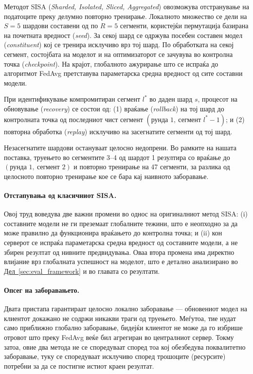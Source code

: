 Методот SISA (\emph{Sharded, Isolated, Sliced, Aggregated}) \cite{bourtoule2021sisa} овозможува отстранување на податоците преку делумно повторно тренирање. Локалното множество се дели на $S=5$ шардови составени од по $R=5$ сегменти, користејќи пермутација базирана на почетната вредност (\emph{seed}). За секој шард се одржува посебен составен модел (\emph{constituent}) кој се тренира исклучиво врз тој шард. По обработката на секој сегмент, состојбата на моделот и на оптимизаторот се зачувува во контролна точка (\emph{checkpoint}). На крајот, глобалното ажурирање што се испраќа до алгоритмот FedAvg претставува параметарска средна вредност од сите составни модели.

При идентификување компромитиран сегмент $l^{*}$ во даден шард $s$, процесот на обновување (\emph{recovery}) се состои од:
(1) враќање (\emph{rollback}) на тој шард до контролната точка од последниот чист сегмент $(\text{рунда }1,\ \text{сегмент }l^{*}\!-\!1)$; и
(2) повторна обработка (\emph{replay}) исклучиво на засегнатите сегменти од тој шард. 

Незасегнатите шардови остануваат целосно недопрени. Во рамките на нашата поставка, труењето во сегментите 3--4 од шардот 1 резултира со враќање до $(\text{рунда }1,\ \text{сегмент }2)$ и повторно тренирање на 47 сегменти, за разлика од целосното повторно тренирање кое се бара кај наивното заборавање.

\paragraph{Отстапувања од класичниот SISA.} Овој труд воведува две важни промени во однос на оригиналниот метод SISA: (i) составните модели не ги преземаат глобалните тежини, што е неопходно за да може правилно да функционира враќањето до контролна точка; и (ii) кон серверот се испраќа параметарска средна вредност од составните модели, а не збирен резултат од нивните предвидувања. Оваа втора промена има директно влијание врз глобалната успешност на моделот, што е детално анализирано во \hyperref[sec:eval_framework]{Дел~\ref*{sec:eval_framework}} и во главата со резултати.

\paragraph{Опсег на заборавањето.} Двата пристапа гарантираат целосно локално заборавање --- обновениот модел на клиентот докажано не содржи никакви траги од труењето. Меѓутоа, тие нудат само приближно глобално заборавање, бидејќи клиентот не може да го избрише отровот што преку FedAvg веќе бил агрегиран во централниот сервер. Токму затоа, овие два метода не се споредуваат според тоа кој обезбедува поквалитетно заборавање, туку се споредуваат исклучиво според трошоците (ресурсите) потребни за да се постигне истиот краен резултат.

